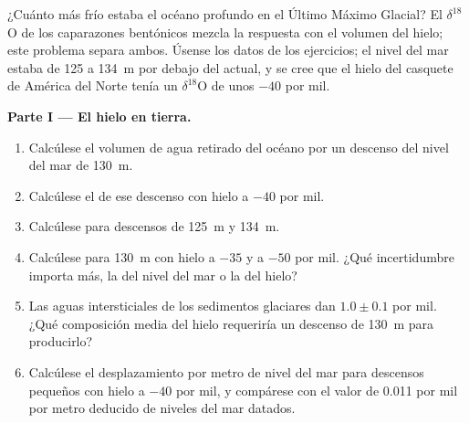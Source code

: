 \begin{problem}\label{pb:b2:climate-proxies:1}
¿Cuánto más frío estaba el océano profundo en el Último Máximo Glacial? El $\delta^{18}$O de los caparazones bentónicos
mezcla la respuesta con el volumen del hielo; este problema separa ambos. Úsense los datos de los
ejercicios; el nivel del mar estaba de 125 a \qty{134}{m} por debajo del actual, y se cree que el hielo del casquete de
América del Norte tenía un $\delta^{18}$O de unos $-40$ por mil.

\medskip\noindent\textbf{Parte I --- El hielo en tierra.}
\begin{enumerate}
  \item Calcúlese el volumen de agua retirado del océano por un descenso del nivel del mar de \qty{130}{m}.
  \item Calcúlese el  de ese descenso con hielo a $-40$ por mil.
  \item Calcúlese para descensos de \qty{125}{m} y \qty{134}{m}.
  \item Calcúlese para \qty{130}{m} con hielo a $-35$ y a $-50$ por mil. ¿Qué incertidumbre
        importa más, la del nivel del mar o la del hielo?
  \item Las aguas intersticiales de los sedimentos glaciares dan $1.0 \pm 0.1$ por mil. ¿Qué composición media
        del hielo requeriría un descenso de \qty{130}{m} para producirlo?
  \item Calcúlese el desplazamiento por metro de nivel del mar para descensos pequeños con hielo a $-40$ por mil, y
        compárese con el valor de \num{0.011} por mil por metro deducido de niveles del mar datados.
\end{enumerate}


\end{problem}
